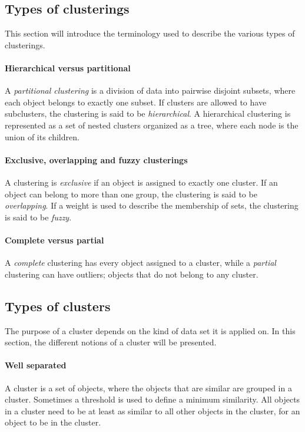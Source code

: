 \subsection{Types of clusterings}
This section will introduce the terminology used to describe the various types of clusterings. 

\paragraph{Hierarchical versus partitional}
A \textit{partitional clustering} is a division of data into pairwise disjoint subsets, where each object belongs to exactly one subset.
If clusters are allowed to have subclusters, the clustering is said to be \textit{hierarchical}.
A hierarchical clustering is represented as a set of nested clusters organized as a tree, where each node is the union of its children.

\paragraph{Exclusive, overlapping and fuzzy clusterings}

A clustering is \textit{exclusive} if an object is assigned to exactly one cluster.
If an object can belong to more than one group, the clustering is said to be \textit{overlapping}.
If a weight is used to describe the membership of sets, the clustering is said to be \textit{fuzzy}.

\paragraph{Complete versus partial}

A \textit{complete} clustering has every object assigned to a cluster, while a \textit{partial} clustering can have outliers; objects that do not belong to any cluster.

\subsection{Types of clusters}
The purpose of a cluster depends on the kind of data set it is applied on.
In this section, the different notions of a cluster will be presented.

\paragraph{Well separated}
A cluster is a set of objects, where the objects that are similar are grouped in a cluster. 
Sometimes a threshold is used to define a minimum similarity. 
All objects in a cluster need to be at least as similar to all other objects in the cluster, for an object to be in the cluster.

